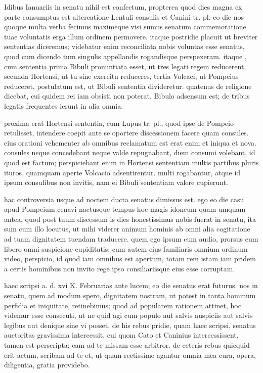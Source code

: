 


 Idibus Ianuariis in senatu nihil est confectum, propterea quod dies magna ex parte consumptus est altercatione Lentuli consulis et Canini tr. pl. eo die nos quoque multa verba fecimus maximeque visi sumus senatum commemoratione tuae voluntatis erga illum ordinem permovere. itaque postridie placuit ut breviter sententias diceremus; videbatur enim reconciliata nobis voluntas esse senatus, quod cum dicendo tum singulis appellandis rogandisque perspexeram. itaque , cum sententia prima Bibuli pronuntiata esset, ut tres legati regem reducerent, secunda Hortensi, ut tu sine exercitu reduceres, tertia Volcaci, ut Pompeius reduceret, postulatum est, ut Bibuli sententia divideretur. quatenus de religione dicebat, cui quidem rei iam obsisti non poterat, Bibulo adsensum est; de tribus legatis frequentes ierunt in alia omnia.

 proxima erat Hortensi sententia, cum Lupus tr. pl., quod ipse de Pompeio retulisset, intendere coepit ante se oportere discessionem facere quam consules. eius orationi vehementer ab omnibus reclamatum est erat enim et iniqua et nova. consules neque concedebant neque valde repugnabant, diem consumi volebant, id quod est factum; perspiciebant enim in Hortensi sententiam multis partibus pluris ituros, quamquam aperte Volcacio adsentirentur. multi rogabantur, atque id ipsum consulibus non invitis, nam ei Bibuli sententiam valere cupierunt.

 hac controversia usque ad noctem ducta senatus dimissus est. ego eo die casu apud Pompeium cenavi nactusque tempus hoc magis idoneum quam umquam antea, quod post tuum discessum is dies honestissimus nobis fuerat in senatu, ita sum cum illo locutus, ut mihi viderer animum hominis ab omni alia cogitatione ad tuam dignitatem tuendam traducere. quem ego ipsum cum audio, prorsus eum libero omni suspicione cupiditatis; cum autem eius familiaris omnium ordinum video, perspicio, id quod iam omnibus est apertum, totam rem istam iam pridem a certis hominibus non invito rege ipso consiliariisque eius esse corruptam.

 haec scripsi a. d. xvi K. Februarias ante lucem; eo die senatus erat futurus. nos in senatu, quem ad modum spero, dignitatem nostram, ut potest in tanta hominum perfidia et iniquitate, retinebimus; quod ad popularem rationem attinet, hoc videmur esse consecuti, ut ne quid agi cum populo aut salvis auspiciis aut salvis legibus aut denique sine vi posset. de his rebus pridie, quam haec scripsi, senatus auctoritas gravissima intercessit, cui quom Cato et Caninius intercessissent, tamen est perscripta; eam ad te missam esse arbitror. de ceteris rebus quicquid erit actum, scribam ad te et, ut quam rectissime agantur omnia mea cura, opera, diligentia, gratia providebo.
